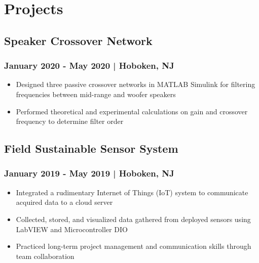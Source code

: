 \documentclass[a4paper, 11pt]{article}
\newenvironment{tightemize}{\vspace{-\topsep}
\begin{itemize}[leftmargin=1em]\itemsep1pt \parskip0pt \parsep0pt}
{\end{itemize}\vspace{-\topsep}}
\begin{document}
\hfill
\begin{minipage}[h]{0.63\textwidth}
\fontsize{10}{0}\selectfont
\vspace{1em}
\section{Projects}
\subsection{Speaker Crossover Network}
\subsubsection{January 2020 - May 2020 | Hoboken, NJ}\vspace{0.75em}
\begin{tightemize}
\vspace{0.75em}
\item{\textcolor{location}{Designed three passive crossover networks in MATLAB Simulink for filtering frequencies between mid-range and woofer speakers}}
\item{\textcolor{location}{Performed theoretical and experimental calculations on gain and crossover frequency to determine filter order}}
\end{tightemize}
\vspace{-1em}
\subsection{Field Sustainable Sensor System} 
\subsubsection{January 2019 - May 2019 | Hoboken, NJ}\vspace{-0.75em}

\begin{tightemize}
\fontsize{10}{0}\selectfont
\item{\textcolor{location}{Integrated a rudimentary Internet of Things (IoT) system to communicate acquired data to a cloud server}}
\item{\textcolor{location}{Collected, stored, and visualized data gathered from deployed sensors using LabVIEW and Microcontroller DIO}}
\item{\textcolor{location}{Practiced long-term project management and communication skills through team collaboration}}
\end{tightemize}
\vspace{-1em}

\end{minipage}
\end{document}
